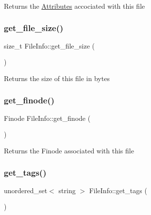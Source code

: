 \begin{DoxyReturn}{Returns}
the \mbox{\hyperlink{class_attributes}{Attributes}} accociated with this file 
\end{DoxyReturn}
\mbox{\label{class_file_info_aa07a5b95bfd41814b7fb2ee30a279c65}} 
\subsubsection{\texorpdfstring{get\+\_\+file\+\_\+size()}{get\_file\_size()}}
{\footnotesize\ttfamily size\+\_\+t File\+Info\+::get\+\_\+file\+\_\+size (\begin{DoxyParamCaption}{ }\end{DoxyParamCaption})}

\begin{DoxyReturn}{Returns}
the size of this file in bytes 
\end{DoxyReturn}
\mbox{\label{class_file_info_a706117270bcf31739d7ce0aa0d79891f}} 
\subsubsection{\texorpdfstring{get\+\_\+finode()}{get\_finode()}}
{\footnotesize\ttfamily Finode File\+Info\+::get\+\_\+finode (\begin{DoxyParamCaption}{ }\end{DoxyParamCaption})}

\begin{DoxyReturn}{Returns}
the Finode associated with this file 
\end{DoxyReturn}
\mbox{\label{class_file_info_a63d01334c1c2ae22e5d1930afa5c74d4}} 
\subsubsection{\texorpdfstring{get\+\_\+tags()}{get\_tags()}}
{\footnotesize\ttfamily unordered\+\_\+set$<$ string $>$ File\+Info\+::get\+\_\+tags (\begin{DoxyParamCaption}{ }\end{DoxyParamCaption})}

